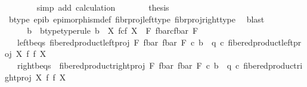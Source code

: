 \begin{isabellebody}
\ \ \ \ \ \ \isamarkupfalse%
\ {\isacharparenleft}{\kern0pt}simp\ add{\isacharcolon}{\kern0pt}\ calculation{\isacharparenright}{\kern0pt}\isanewline
\ \ \ \ \isamarkupfalse%
\ \isamarkupfalse%
\ {\isacharquery}{\kern0pt}thesis\isanewline
\ \ \ \ \ \ \isamarkupfalse%
\ b{\isacharunderscore}{\kern0pt}type\ epi{\isacharunderscore}{\kern0pt}b\ epimorphism{\isacharunderscore}{\kern0pt}def{}\ fibr{\isacharunderscore}{\kern0pt}proj{\isacharunderscore}{\kern0pt}left{\isacharunderscore}{\kern0pt}type\ fibr{\isacharunderscore}{\kern0pt}proj{\isacharunderscore}{\kern0pt}right{\isacharunderscore}{\kern0pt}type\ \isamarkupfalse%
\ blast\isanewline
\ \ \isamarkupfalse%
\isanewline
\isanewline
\ \ \isanewline
\ \ \isanewline
\ \ \isamarkupfalse%
\ \isamarkupfalse%
\ b\ \ b{\isacharunderscore}{\kern0pt}type{\isacharbrackleft}{\kern0pt}type{\isacharunderscore}{\kern0pt}rule{\isacharbrackright}{\kern0pt}{\isacharcolon}{\kern0pt}\ {\isachardoublequoteopen}b\ {\isacharcolon}{\kern0pt}\ X\ \isactrlbsub f\isactrlesub {\isasymtimes}\isactrlsub c\isactrlbsub f\isactrlesub \ X\ {\isasymrightarrow}\ F\ \isactrlbsub {\isacharparenleft}{\kern0pt}f{\isacharunderscore}{\kern0pt}bar{\isacharparenright}{\kern0pt}\isactrlesub {\isasymtimes}\isactrlsub c\isactrlbsub {\isacharparenleft}{\kern0pt}f{\isacharunderscore}{\kern0pt}bar{\isacharparenright}{\kern0pt}\isactrlesub \ F{\isachardoublequoteclose}\ \isanewline
\ \ \ left{\isacharunderscore}{\kern0pt}b{\isacharunderscore}{\kern0pt}eqs{\isacharcolon}{\kern0pt}\ {\isachardoublequoteopen}fibered{\isacharunderscore}{\kern0pt}product{\isacharunderscore}{\kern0pt}left{\isacharunderscore}{\kern0pt}proj\ F\ {\isacharparenleft}{\kern0pt}f{\isacharunderscore}{\kern0pt}bar{\isacharparenright}{\kern0pt}\ {\isacharparenleft}{\kern0pt}f{\isacharunderscore}{\kern0pt}bar{\isacharparenright}{\kern0pt}\ F\ {\isasymcirc}\isactrlsub c\ b\ {\isacharequal}{\kern0pt}\ q\ {\isasymcirc}\isactrlsub c\ fibered{\isacharunderscore}{\kern0pt}product{\isacharunderscore}{\kern0pt}left{\isacharunderscore}{\kern0pt}proj\ X\ f\ f\ X{\isachardoublequoteclose}\ \isanewline
\ \ \ right{\isacharunderscore}{\kern0pt}b{\isacharunderscore}{\kern0pt}eqs{\isacharcolon}{\kern0pt}\ \ {\isachardoublequoteopen}fibered{\isacharunderscore}{\kern0pt}product{\isacharunderscore}{\kern0pt}right{\isacharunderscore}{\kern0pt}proj\ F\ {\isacharparenleft}{\kern0pt}f{\isacharunderscore}{\kern0pt}bar{\isacharparenright}{\kern0pt}\ {\isacharparenleft}{\kern0pt}f{\isacharunderscore}{\kern0pt}bar{\isacharparenright}{\kern0pt}\ F\ {\isasymcirc}\isactrlsub c\ b\ {\isacharequal}{\kern0pt}\ q\ {\isasymcirc}\isactrlsub c\ fibered{\isacharunderscore}{\kern0pt}product{\isacharunderscore}{\kern0pt}right{\isacharunderscore}{\kern0pt}proj\ X\ f\ f\ X{\isachardoublequoteclose}\ \isanewline

\end{isabellebody}
